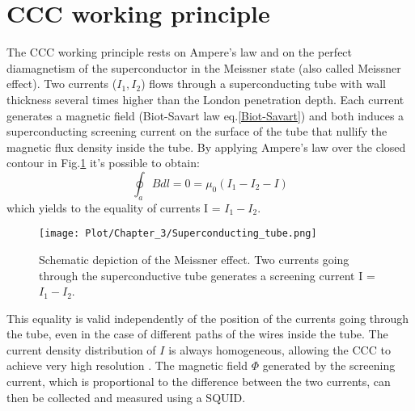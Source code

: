 \documentclass[12pt,a4paper]{report}
\begin{document}
    \section{CCC working principle}
    The CCC working principle rests on Ampere's law and on the perfect diamagnetism of the superconductor in the Meissner state (also called Meissner effect). Two currents ($I_1,I_2$) flows through a superconducting tube with wall thickness several times higher than the London penetration depth. Each current generates a magnetic field (Biot-Savart law eq.\ref{Biot-Savart}) and both induces a superconducting screening current on the surface of the tube that nullify the magnetic flux density inside the tube. By applying Ampere's law over the closed contour in Fig.\ref{CH3_Meissner_effect} it's possible to obtain:
    \begin{equation}
    	\oint_a Bdl = 0 = \mu_0 (I_1-I_2-I)
    \end{equation}
    which yields to the equality of currents I = $I_1-I_2$.
     \begin{figure} [H]
    	\centering
    	\texttt{[image: Plot/Chapter\_3/Superconducting\_tube.png]}
    	\caption{\small{Schematic depiction of the Meissner effect. Two currents going through the superconductive tube generates a screening current I = $I_1-I_2$.}}
    	\label{CH3_Meissner_effect}
    \end{figure}
    This equality is valid independently of the position of the currents going through the tube, even in the case of different paths of the wires inside the tube. The current density distribution of \( I \) is always homogeneous, allowing the CCC to achieve very high resolution \cite{Handbook_squid} \cite{GROHMANN_CCC}. The magnetic field \( \Phi \) generated by the screening current, which is proportional to the difference between the two currents, can then be collected and measured using a SQUID.
\end{document}
